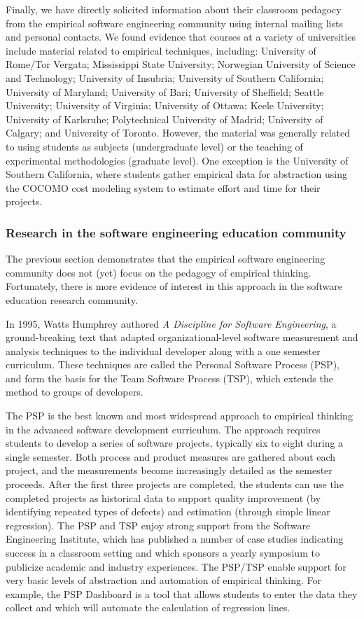 Finally, we have directly solicited information about their classroom
pedagocy from the empirical software engineering community using internal
mailing lists and personal contacts. We found evidence that courses at a
variety of universities include material related to empirical techniques,
including: University of Rome/Tor Vergata; Mississippi State University;
Norwegian University of Science and Technology; University of Insubria;
University of Southern California; University of Maryland; University of
Bari; University of Sheffield; Seattle University; University of Virginia;
University of Ottawa; Keele University; University of Karlsruhe;
Polytechnical University of Madrid; University of Calgary; and University
of Toronto.  However, the material was generally related to using students
as subjects (undergraduate level) or the teaching of experimental
methodologies (graduate level).  One exception is the University of
Southern California, where students gather empirical data for abstraction
using the COCOMO cost modeling system to estimate effort and time for their
projects.

\subsubsection{Research in the software engineering education community}

The previous section demonstrates that the empirical software engineering
community does not (yet) focus on the pedagogy of empirical thinking. Fortunately, 
there is more evidence of interest in this approach in the software education 
research community.

In 1995, Watts Humphrey authored {\em A Discipline for Software
Engineering}, a ground-breaking text that adapted organizational-level
software measurement and analysis techniques to the individual developer
along with a one semester curriculum. These techniques are called the
Personal Software Process (PSP), and form the basis for the Team Software
Process (TSP), which extends the method to groups of developers. 

The PSP is the best known and most widespread approach to empirical
thinking in the advanced software development curriculum.  The approach
requires students to develop a series of software projects, typically six
to eight during a single semester.  Both process and product measures are
gathered about each project, and the measurements become increasingly
detailed as the semester proceeds. After the first three projects are
completed, the students can use the completed projects as historical data
to support quality improvement (by identifying repeated types of defects)
and estimation (through simple linear regression).  The PSP and TSP enjoy
strong support from the Software Engineering Institute, which has published
a number of case studies indicating success in a classroom setting and
which sponsors a yearly symposium to publicize academic and industry
experiences.  The PSP/TSP enable support for very basic levels of
abstraction and automation of empirical thinking. For example, the PSP
Dashboard is a tool that allows students to enter the data they collect and
which will automate the calculation of regression lines.

